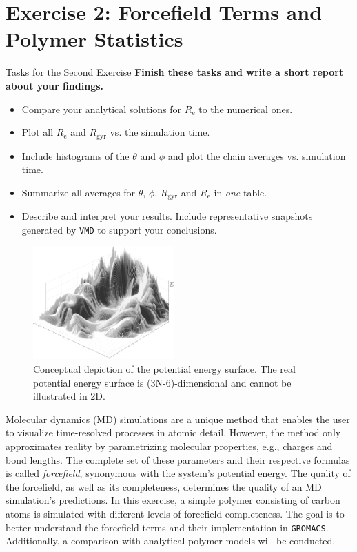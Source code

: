 \documentclass[9pt,tutorial]{livecoms}
\begin{document}
    
\section{Exercise 2: Forcefield Terms and Polymer Statistics}\label{sec:ForceField}
\begin{Checklists}
    \begin{checklist}{Tasks for the Second Exercise}
    \textbf{Finish these tasks and write a short report about your findings.}
    \begin{itemize}
    	\item Compare your analytical solutions for $R_\text{e}$ to the numerical ones.
		
		\item Plot all $R_\text{e}$ and $R_\text{gyr}$ vs. the simulation time.
		
		\item Include histograms of the $\theta$ and $\phi$ and plot the chain averages vs. simulation time.
		
		\item Summarize all averages for $\theta$, $\phi$, $R_\text{gyr}$ and $R_\text{e}$ in \textit{one} table.
		
		\item Describe and interpret your results. Include representative snapshots generated by \texttt{VMD} to support your conclusions.
    \end{itemize}
    \end{checklist}
\end{Checklists}

\begin{figure}[H]
    \centering
    \includegraphics[width=0.48\textwidth]{figures/PES_concept.png}
    \caption{Conceptual depiction of the potential energy surface. The real potential energy surface is (3N-6)-dimensional and cannot be illustrated in 2D.}
    \label{fig:PES_concept}
\end{figure}
Molecular dynamics (MD) simulations are a unique method that enables the user to visualize time-resolved processes in atomic detail. However, the method only approximates reality by parametrizing molecular properties, e.g., charges and bond lengths. The complete set of these parameters and their respective formulas is called \textit{forcefield}, synonymous with the system's potential energy. The quality of the forcefield, as well as its completeness, determines the quality of an MD simulation's predictions. In this exercise, a simple polymer consisting of carbon atoms is simulated with different levels of forcefield completeness. The goal is to better understand the forcefield terms and their implementation in \texttt{GROMACS}. Additionally, a comparison with analytical polymer models will be conducted. 
\end{document}
